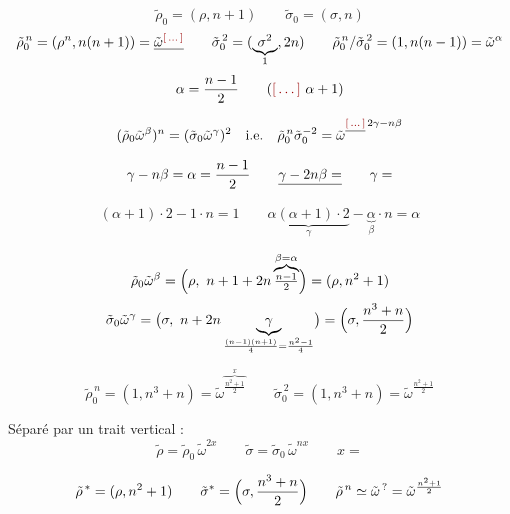 \documentclass[11pt,a4paper]{article}
\begin{document}
\[
\tilde\rho_0 = (\rho, n+1) \qquad \tilde\sigma_0 = (\sigma, n)
\]
\[
\tilde\rho_0^{\,n} = (\rho^n, n(n+1)) = \struck{\tilde\omega^{\ill{}}}
\qquad
\tilde\sigma_0^{\,2} = (\underbrace{\sigma^2}_{1}, 2n)
\qquad
\tilde\rho_0^{\,n}/\tilde\sigma_0^{\,2} = (1, n(n-1)) = \tilde\omega^{\alpha}
\]
\[
\alpha = \frac{n-1}{2} \qquad (\ill{}\ \alpha + 1)
\]

\[
(\tilde\rho_0\tilde\omega^{\beta})^{n} = (\tilde\sigma_0\tilde\omega^{\gamma})^{2}
\quad \text{i.e.} \quad
\tilde\rho_0^{\,n}\tilde\sigma_0^{-2} = \tilde\omega^{\struck{\ill{}}\,2\gamma - n\beta}
\]

\[
\gamma - n\beta = \alpha = \frac{n-1}{2}
\qquad \struck{\gamma - 2n\beta =}
\qquad \gamma =
\]

\[
(\alpha+1)\cdot 2 - 1 \cdot n = 1
\qquad
\underbrace{\alpha(\alpha+1)\cdot 2}_{\gamma} - \underbrace{\alpha}_{\beta}\cdot n = \alpha
\]

\[
\tilde\rho_0\tilde\omega^{\beta} = \Bigl(\rho,\ n + 1 + 2n\overbrace{\tfrac{n-1}{2}}^{\beta = \alpha}\Bigr)
= (\rho, n^2 + 1)
\]
\[
\tilde\sigma_0\tilde\omega^{\gamma} = \bigl(\sigma,\ n + 2n\underbrace{\gamma}_{\frac{(n-1)(n+1)}{4} = \frac{n^2-1}{4}}\bigr)
= \Bigl(\sigma, \frac{n^3+n}{2}\Bigr)
\]


\[
\tilde\rho_0^{\,n} = (1, n^3 + n) = \tilde\omega^{\overbrace{\scriptstyle\frac{n^2+1}{2}}^{x}}
\qquad
\tilde\sigma_0^{\,2} = (1, n^3 + n) = \tilde\omega^{\frac{n^2+1}{2}}
\]


Séparé par un trait vertical :
\[
\tilde\rho = \tilde\rho_0\,\tilde\omega^{2x} \qquad
\tilde\sigma = \tilde\sigma_0\,\tilde\omega^{nx} \qquad x =
\]


\[
\tilde\rho^{\,*} = (\rho, n^2 + 1) \qquad
\tilde\sigma^{*} = \Bigl(\sigma, \frac{n^3+n}{2}\Bigr)
\qquad
\tilde\rho^{\,n} \simeq \tilde\omega^{\,?} = \tilde\omega^{\frac{n^2+1}{2}}
\]
\end{document}
